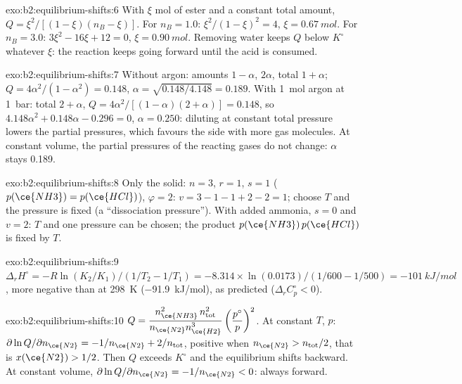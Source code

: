 \begin{solution}{exo:b2:equilibrium-shifts:6}
With $\xi$ mol of ester and a constant total amount, $Q =
\xi^2/[(1 - \xi)(n_B - \xi)]$. For $n_B = 1.0$: $\xi^2/(1 - \xi)^2 = 4$, $\xi
= \qty{0.67}{mol}$. For $n_B = 3.0$: $3\xi^2 - 16\xi + 12 = 0$, $\xi =
\qty{0.90}{mol}$. Removing water keeps $Q$ below $K^\circ$ whatever $\xi$: the
reaction keeps going forward until the acid is consumed.
\end{solution}

\begin{solution}{exo:b2:equilibrium-shifts:7}
Without argon: amounts $1 - \alpha$, $2\alpha$, total $1 + \alpha$;
$Q = 4\alpha^2/(1 - \alpha^2) = 0.148$, $\alpha = \sqrt{0.148/4.148} = 0.189$.
With \qty{1}{mol} argon at \qty{1}{bar}: total $2 + \alpha$, $Q =
4\alpha^2/[(1 - \alpha)(2 + \alpha)] = 0.148$, so $4.148\alpha^2 + 0.148\alpha
- 0.296 = 0$, $\alpha = 0.250$: diluting at constant total pressure lowers the
partial pressures, which favours the side with more gas molecules. At
constant volume, the partial pressures of the reacting gases do not change:
$\alpha$ stays 0.189.
\end{solution}

\begin{solution}{exo:b2:equilibrium-shifts:8}
Only the solid: $n = 3$, $r = 1$, $s = 1$ ($p(\ce{NH3}) = p(\ce{HCl})$),
$\varphi = 2$: $v = 3 - 1 - 1 + 2 - 2 = 1$; choose $T$ and the pressure is
fixed (a ``dissociation pressure''). With added ammonia, $s = 0$ and $v = 2$:
$T$ and one pressure can be chosen; the product $p(\ce{NH3})\,p(\ce{HCl})$ is
fixed by $T$.
\end{solution}

\begin{solution}{exo:b2:equilibrium-shifts:9}
$\Delta_r H^\circ = -R\ln(K_2/K_1)/(1/T_2 - 1/T_1) = -8.314 \times
\ln(0.0173)/(1/600 - 1/500) = \qty{-101}{kJ/mol}$, more negative than at
\qty{298}{K} (\qty{-91.9}{kJ/mol}), as  predicted
($\Delta_r C_p^\circ < 0$).
\end{solution}

\begin{solution}{exo:b2:equilibrium-shifts:10}
$Q = \dfrac{n_{\ce{NH3}}^2\,n_{\text{tot}}^2}{n_{\ce{N2}}n_{\ce{H2}}^3}
\left(\dfrac{p^\circ}{p}\right)^2$. At constant $T$, $p$:
$\partial\ln Q/\partial n_{\ce{N2}} = -1/n_{\ce{N2}} + 2/n_{\text{tot}}$, positive
when $n_{\ce{N2}} > n_{\text{tot}}/2$, that is $x(\ce{N2}) > 1/2$. Then $Q$
exceeds $K^\circ$ and the equilibrium shifts backward. At constant volume,
$\partial\ln Q/\partial n_{\ce{N2}} = -1/n_{\ce{N2}} < 0$: always forward.
\end{solution}

